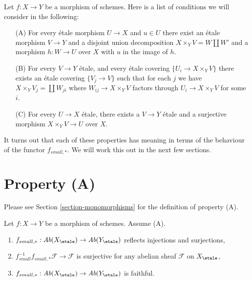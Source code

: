 \noindent
Let $f : X \to Y$ be a morphism of schemes.
Here is a list of conditions we will consider in the following:
\begin{enumerate}
\item[(A)] For every \'etale morphism $U \to X$ and $u \in U$ there exist
an \'etale morphism $V \to Y$ and a disjoint union decomposition
$X \times_Y V = W \amalg W'$ and a morphism $h : W \to U$ over $X$
with $u$ in the image of $h$.
\item[(B)] For every $V \to Y$ \'etale, and every \'etale covering
$\{U_i \to X \times_Y V\}$ there exists an \'etale covering
$\{V_j \to V\}$ such that for each $j$ we have
$X \times_Y V_j = \coprod W_{ji}$ where $W_{ij} \to X \times_Y V$
factors through $U_i \to X \times_Y V$ for some $i$.
\item[(C)] For every $U \to X$ \'etale, there exists a $V \to Y$ \'etale
and a surjective morphism $X \times_Y V \to U$ over $X$.
\end{enumerate}
It turns out that each of these properties has meaning in terms of
the behaviour of the functor $f_{small, *}$. We will work this
out in the next few sections.



\section{Property (A)}
\label{section-A}

\noindent
Please see Section \ref{section-monomorphisms} for the definition of property
(A).

\begin{lemma}
\label{lemma-property-A-implies}
Let $f : X \to Y$ be a morphism of schemes.
Assume (A).
\begin{enumerate}
\item
$f_{small, *} :
\textit{Ab}(X_\etale)
\to
\textit{Ab}(Y_\etale)$
reflects injections and surjections,
\item $f_{small}^{-1}f_{small, *}\mathcal{F} \to \mathcal{F}$
is surjective for any abelian sheaf $\mathcal{F}$ on $X_\etale$,
\item
$f_{small, *} :
\textit{Ab}(X_\etale)
\to
\textit{Ab}(Y_\etale)$
is faithful.
\end{enumerate}
\end{lemma}

